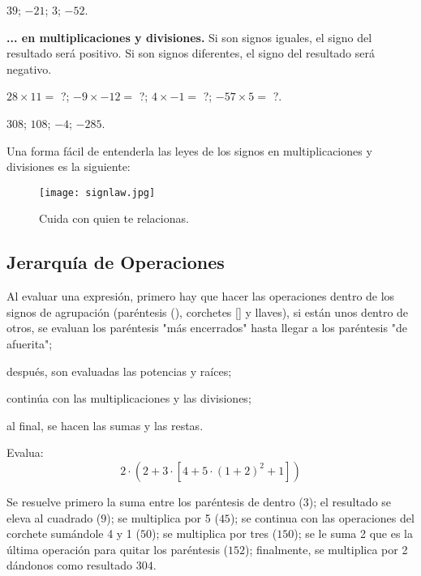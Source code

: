 $39$; $-21$; $3$; $-52$. 

\textbf{... en multiplicaciones y divisiones.} Si son signos 
iguales, el signo del resultado será positivo. Si son signos 
diferentes, el signo del resultado será negativo.

\begin{example}
    $28\times 11 =$ ?;
    $-9\times -12 =$ ?;
    $4\times -1 =$ ?;
    $-57\times 5 =$ ?.
\end{example}

$308$; $108$; $-4$; $-285$. 

Una forma fácil de entenderla las leyes de los signos en 
multiplicaciones y divisiones es la siguiente:

\begin{figure}
    \centering
    \texttt{[image: signlaw.jpg]}
    \caption{Cuida con quien te relacionas.}
\end{figure}

\subsection{Jerarquía de Operaciones}

\begin{enumerate}
    \ii Al evaluar una expresión, primero hay que hacer las 
    operaciones dentro de los signos de agrupación (paréntesis (), 
    corchetes [] y llaves${}$), si están unos dentro de otros, 
    se evaluan los paréntesis "más encerrados" 
    hasta llegar a los paréntesis "de afuerita";

    \ii después, son evaluadas las potencias y raíces;

    \ii continúa con las multiplicaciones y las divisiones;

    \ii al final, se hacen las sumas y las restas.
\end{enumerate}

\begin{example}
    Evalua: 
    \[2\cdot\left(2+3\cdot\left[4+5\cdot\left(1+2\right)^2+1\right]\right) \]
\end{example}

Se resuelve primero la suma entre los paréntesis de dentro ($3$); 
el resultado se eleva al cuadrado ($9$); 
se multiplica por 5 ($45$); 
se continua con las operaciones del corchete sumándole 4 y 1 ($50$);
se multiplica por tres ($150$);
se le suma 2 que es la última operación para quitar los paréntesis ($152$);
finalmente, se multiplica por 2 dándonos como resultado $304$.

